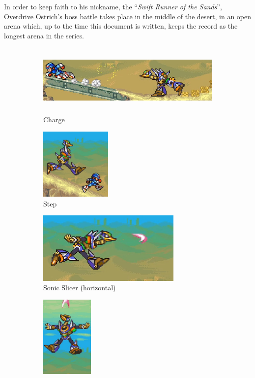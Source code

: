 In order to keep faith to his nickname, the ``\textit{Swift Runner of the Sands}'', Overdrive Ostrich's boss battle takes place in the middle of the desert, in an open arena which, up to the time this document is written, keeps the record as the longest arena in the series. 
\begin{figure}[htp]
	\centering
	\begin{subfigure}{\linewidth}
		\centering
		\includegraphics[width=0.8\linewidth, height=3.5cm]{figures/X2/Overdrive_ostrich/Ostrich_running.png}
		\caption{Charge}
	\end{subfigure}
	\begin{subfigure}{0.3\linewidth}
		\centering
		\includegraphics[height=3.5cm]{figures/X2/Overdrive_ostrich/Ostrich_run&jump.png}
		\caption{Step}
	\end{subfigure}
	\begin{subfigure}{0.5\linewidth}
		\centering
		\includegraphics[height= 3.5cm,width=\linewidth]{figures/X2/Overdrive_ostrich/Ostrich_sonic_slicer.png}
		\caption{Sonic Slicer (horizontal)}
	\end{subfigure}
	\begin{subfigure}{\linewidth}
		\centering
		\includegraphics[height=4cm]{figures/X2/Overdrive_ostrich/Ostrich_charged_SS.png}

\end{subfigure}
\end{figure}
